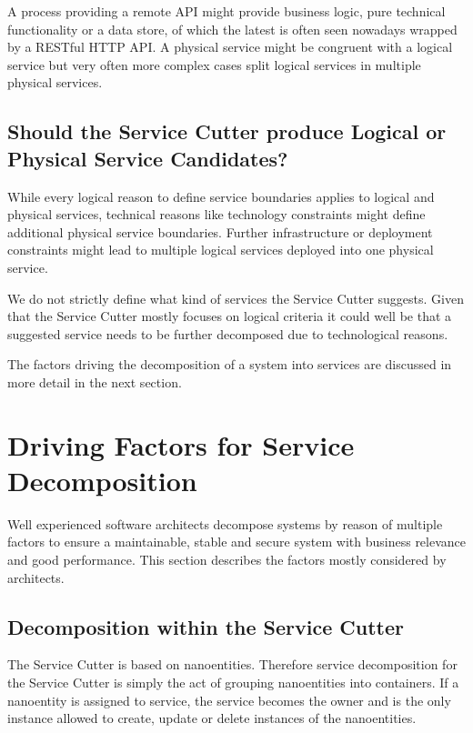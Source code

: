 A process providing a remote API might provide business logic, pure technical functionality or a data store, of which the latest is often seen nowadays wrapped by a RESTful HTTP API. A physical service might be congruent with a logical service but very often more complex cases split logical services in multiple physical services. 

\subsection{Should the Service Cutter produce Logical or Physical Service Candidates?}

While every logical reason to define service boundaries applies to logical and physical services, technical reasons like technology constraints might define additional physical service boundaries. Further infrastructure or deployment constraints might lead to multiple logical services deployed into one physical service. 

We do not strictly define what kind of services the Service Cutter suggests. Given that the Service Cutter mostly focuses on logical criteria it could well be that a suggested service needs to be further decomposed due to technological reasons.

The factors driving the decomposition of a system into services are discussed in more detail in the next section.


\section{Driving Factors for Service Decomposition}

Well experienced software architects decompose systems by reason of multiple factors to ensure a maintainable, stable and secure system with business relevance and good performance. This section describes the factors mostly considered by architects. 

\subsection{Decomposition within the Service Cutter}

The Service Cutter is based on nanoentities. Therefore service decomposition for the Service Cutter is simply the act of grouping nanoentities into containers. If a nanoentity is assigned to service, the service becomes the owner and is the only instance allowed to create, update or delete instances of the nanoentities.

